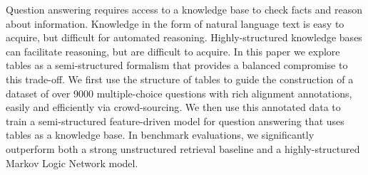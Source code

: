 Question answering requires access to a knowledge base to check facts and reason about information. Knowledge in the form of natural language text is easy to acquire, but difficult for automated reasoning. Highly-structured knowledge bases can facilitate reasoning, but are difficult to acquire. In this paper we explore tables as a semi-structured formalism that provides a balanced compromise to this trade-off. We first use the structure of tables to guide the construction of a dataset of over 9000 multiple-choice questions with rich alignment annotations, easily and efficiently via crowd-sourcing. We then use this annotated data to train a semi-structured feature-driven model for question answering that uses tables as a knowledge base. In benchmark evaluations, we significantly outperform both a strong unstructured retrieval baseline and a highly-structured Markov Logic Network model.

